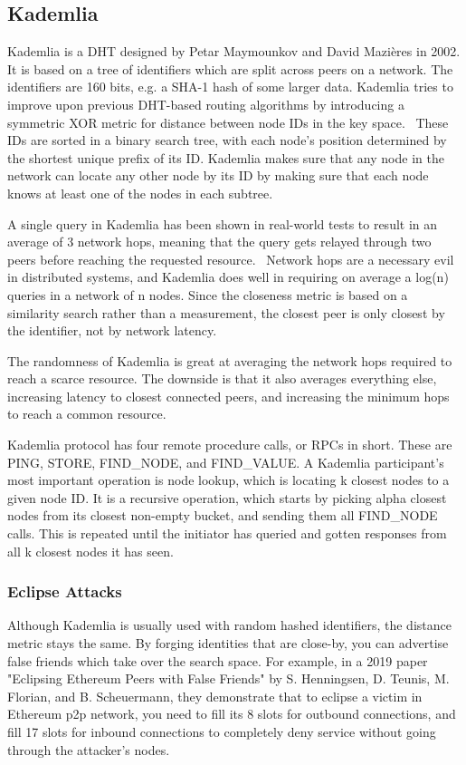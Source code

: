 \subsection{Kademlia}
Kademlia is a DHT designed by Petar Maymounkov and David Mazières in 2002. It is based on a tree of identifiers which are split across peers on a network. The identifiers are 160 bits, e.g. a SHA-1 hash of some larger data. Kademlia tries to improve upon previous DHT-based routing algorithms by introducing a symmetric XOR metric for distance between node IDs in the key space.~\cite{Petar_Maymounkov2020-sx} These IDs are sorted in a binary search tree, with each node's position determined by the shortest unique prefix of its ID. Kademlia makes sure that any node in the network can locate any other node by its ID by making sure that each node knows at least one of the nodes in each subtree.
						
A single query in Kademlia has been shown in real-world tests to result in an average of 3 network hops, meaning that the query gets relayed through two peers before reaching the requested resource.~\cite{Roos2013-mb} Network hops are a necessary evil in distributed systems, and Kademlia does well in requiring on average a log(n) queries in a network of n nodes. Since the closeness metric is based on a similarity search rather than a measurement, the closest peer is only closest by the identifier, not by network latency.~\cite{Eigenmann2020-zm}
						
The randomness of Kademlia is great at averaging the network hops required to reach a scarce resource. The downside is that it also averages everything else, increasing latency to closest connected peers, and increasing the minimum hops to reach a common resource.

Kademlia protocol has four remote procedure calls, or RPCs in short. These are PING, STORE, FIND\_NODE, and FIND\_VALUE. A Kademlia participant's most important operation is node lookup, which is locating k closest nodes to a given node ID. It is a recursive operation, which starts by picking alpha closest nodes from its closest non-empty bucket, and sending them all FIND\_NODE calls. This is repeated until the initiator has queried and gotten responses from all k closest nodes it has seen.

\subsubsection{Eclipse Attacks}
Although Kademlia is usually used with random hashed identifiers, the distance metric stays the same. By forging identities that are close-by, you can advertise false friends which take over the search space. For example, in a 2019 paper "Eclipsing Ethereum Peers with False Friends" by S. Henningsen, D. Teunis, M. Florian, and B. Scheuermann, they demonstrate that to eclipse a victim in Ethereum p2p network, you need to fill its 8 slots for outbound connections, and fill 17 slots for inbound connections to completely deny service without going through the attacker's nodes.~\cite{Henningsen2019-mf}

